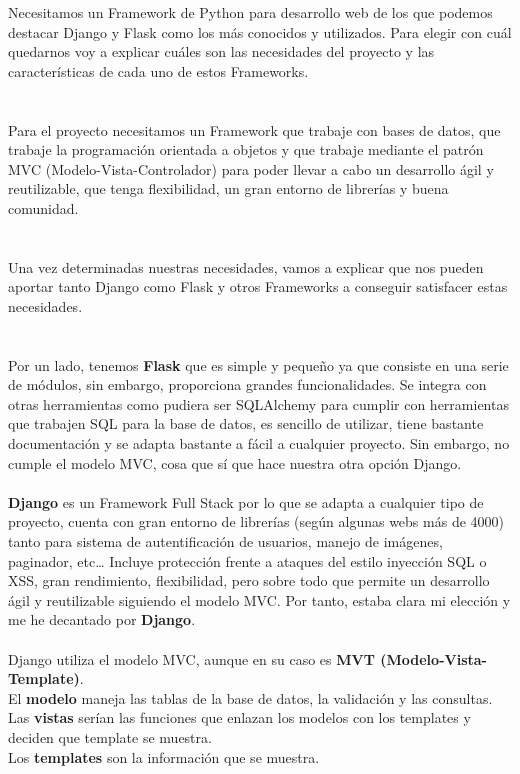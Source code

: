 Necesitamos un Framework de Python para desarrollo web de los que podemos destacar Django y Flask como los más conocidos y utilizados.
Para elegir con cuál quedarnos voy a explicar cuáles son las necesidades del proyecto y las características
de cada uno de estos Frameworks.\\\\
\\
Para el proyecto necesitamos un Framework que trabaje con bases de datos, que trabaje la programación orientada a objetos y que trabaje 
mediante el patrón MVC (Modelo-Vista-Controlador) para poder llevar a cabo un desarrollo ágil y reutilizable, que tenga flexibilidad, 
un gran entorno de librerías y buena comunidad.\\
\\\\
Una vez determinadas nuestras necesidades, vamos a explicar que nos pueden aportar tanto Django como Flask y otros Frameworks a conseguir satisfacer estas necesidades.\\\\
\\
Por un lado, tenemos \textbf{Flask} que es simple y pequeño ya que consiste en una serie de módulos, sin embargo, proporciona grandes funcionalidades.
Se integra con otras herramientas como pudiera ser SQLAlchemy para cumplir con herramientas que trabajen SQL para la base de datos, es sencillo de utilizar, tiene bastante documentación y se adapta bastante a fácil a cualquier proyecto.
Sin embargo, no cumple el modelo MVC, cosa que sí que hace nuestra otra opción Django.\\\\

\textbf{Django} es un Framework Full Stack por lo que se adapta a cualquier tipo de proyecto, cuenta con gran entorno de librerías (según algunas webs más de 4000) tanto para sistema de autentificación de usuarios, manejo de imágenes, paginador, etc\dots
Incluye protección frente a ataques del estilo inyección SQL o XSS, gran rendimiento, flexibilidad, pero sobre todo que permite un desarrollo ágil y reutilizable siguiendo el modelo MVC.
Por tanto, estaba clara mi elección y me he decantado por \textbf{Django}.\\\\

Django utiliza el modelo MVC, aunque en su caso es \textbf{MVT (Modelo-Vista-Template)}.\\
El \textbf{modelo} maneja las tablas de la base de datos, la validación y las consultas.\\
Las \textbf{vistas} serían las funciones que enlazan los modelos con los templates y deciden que template se muestra.\\
Los \textbf{templates} son la información que se muestra.\\ 

